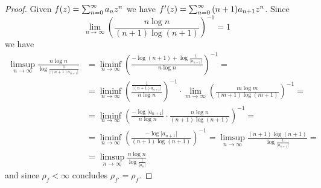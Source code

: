 \begin{proof}
    Given $f(z) = \sum_{n=0}^\infty {a_n}z^{n}$ we have $f'(z) = \sum_{n=0}^\infty {(n+1)a_{n+1}}z^{n}$. Since
    $$ \lim_{n \to \infty} \left( \frac{n \log n}{(n+1) \log(n+1)} \right)^{-1} = 1 $$
    we have
    \begin{align*}
        \limsup_{n \to \infty} \frac{n \log n}{\log \frac{1}{\vert (n+1) a_{n+1} \vert}} &= \liminf_{n \to \infty} \left( \frac{- \log (n+1) + \log \frac{1}{\vert a_{n+1} \vert}}{n \log n} \right)^{-1} = \\
        &= \liminf_{n \to \infty} \left( \frac{\frac{1}{\vert (n+1) a_{n+1} \vert}}{n \log n} \right)^{-1} \cdot \lim_{m \to \infty} \left( \frac{m \log m}{(m+1) \log(m+1)} \right)^{-1} = \\
        &= \liminf_{n \to \infty} \left( \frac{- \log \vert a_{n+1} \vert}{n \log n} \cdot \frac{n \log n}{(n+1) \log(n+1)} \right)^{-1} = \\
        &= \liminf_{n \to \infty} \left( \frac{- \log \vert a_{n+1} \vert}{(n+1) \log(n+1)} \right)^{-1} = \limsup_{n \to \infty} \frac{(n+1) \log (n+1)}{\log \frac{1}{\vert a_{n+1} \vert}} = \\
        &= \limsup_{n \to \infty} \frac{n \log n}{\log \frac{1}{\vert a_{n} \vert}}
    \end{align*}
    and since $\rho_f < \infty$  concludes $\rho_{f'} = \rho_f$.
\end{proof}